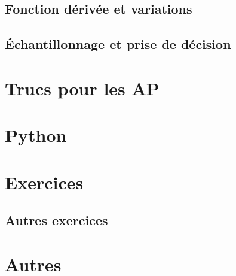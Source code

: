 \documentclass[a4paper,12pt]{book}
\begin{document}
\chapter{Fonction dérivée et variations}


\chapter{Échantillonnage et prise de décision}


\part{Trucs pour les AP}


\part{Python}



\part{Exercices}


\chapter{Autres exercices}


%

\part{Autres}







\printindex
\end{document}
